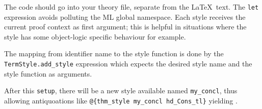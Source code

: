 \begin{isabellebody}
\begin{isamarkuptext}
  The code should go into your theory file, separate from the \LaTeX\ text.
  The \verb!let! expression avoids polluting the
  ML global namespace. Each style receives the current proof context
  as first argument; this is helpful in situations where the
  style has some object-logic specific behaviour for example.

  The mapping from identifier name to the style function
  is done by the \verb|TermStyle.add_style| expression which expects the desired
  style name and the style function as arguments.
  
  After this \verb!setup!,
  there will be a new style available named \verb!my_concl!, thus allowing
  antiquoations like \verb!@!\verb!{thm_style my_concl hd_Cons_tl}!
  yielding .%
\end{isamarkuptext}%
\isamarkuptrue%
%
\isadelimtheory
%
\endisadelimtheory
%
\isatagtheory
%
\endisatagtheory
{\isafoldtheory}%
%
\isadelimtheory
%
\endisadelimtheory
\end{isabellebody}%
